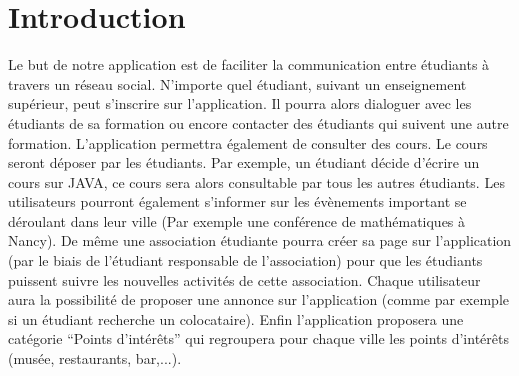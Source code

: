 \section*{Introduction}
Le but de notre application est de faciliter la communication entre étudiants à travers un réseau social. N’importe quel étudiant, suivant un enseignement supérieur, peut s’inscrire sur l'application. Il pourra alors dialoguer avec les étudiants de sa formation ou encore contacter des étudiants qui suivent une autre formation. L'application permettra également de consulter des cours. Le cours seront déposer par les étudiants. Par exemple, un étudiant décide d’écrire un cours sur JAVA, ce cours sera alors consultable par tous les autres étudiants. Les utilisateurs pourront également s’informer sur les évènements important se déroulant dans leur ville (Par exemple une conférence de mathématiques à Nancy). De même une association étudiante pourra créer sa page sur l'application (par le biais de l’étudiant responsable de l’association) pour que les étudiants puissent suivre les nouvelles activités de cette association. Chaque utilisateur aura la possibilité de proposer une annonce sur l'application (comme par exemple si un étudiant recherche un colocataire). Enfin l'application proposera une catégorie “Points d’intérêts” qui regroupera pour chaque ville les points d’intérêts (musée, restaurants, bar,...).